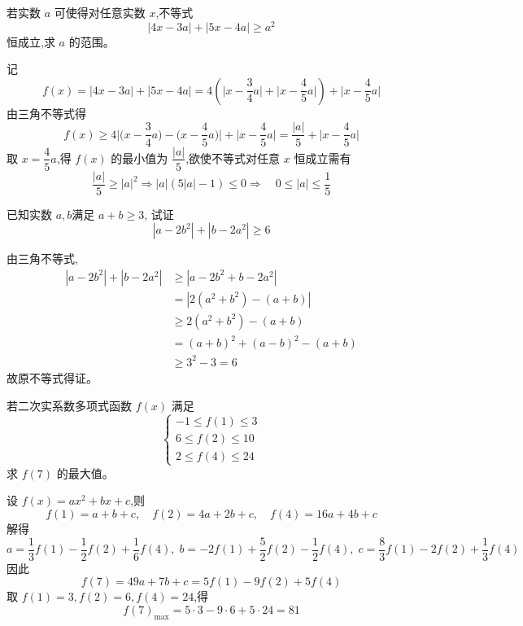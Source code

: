 \begin{questions}
    \question 若实数 $a$ 可使得对任意实数 $x$,不等式 
    \[
    |4x-3a|+|5x-4a|\ge a^{2}
    \]
    恒成立,求 $a$ 的范围。
    \begin{solution}
        记
        \[
        f(x)=|4x-3a| +|5x-4a|= 4\left( \Big|x-\frac{3}{4}a\Big|+ \Big|x-\frac{4}{5}a\Big|\right)+\Big|x-\frac{4}{5}a\Big|
        \]
        由三角不等式得
        \[
        f(x) \ge 4\Big| \Big(x-\frac{3}{4}a\Big)- \Big(x-\frac{4}{5}a\Big)\Big|+\Big|x-\frac{4}{5}a\Big|
        = \frac{|a|}{5}+ \Big|x-\frac{4}{5}a\Big|
        \]
        取 $x=\dfrac{4}{5}a$,得 $f(x)$ 的最小值为 $\dfrac{|a|}{5}$,欲使不等式对任意 $x$ 恒成立需有
        \[
        \frac{|a|}{5} \ge |a|^2 \Rightarrow |a|(5|a|-1)\le 0  \Rightarrow \quad 0\le |a|\le \frac{1}{5}
        \]
    \end{solution}

    \question 已知实数 $a,b$满足 $a+b\ge 3$, 试证 
    \[
    |a-2b^2|+|b-2a^2| \ge 6
    \]
    \begin{solution}
        由三角不等式,
        \begin{align*}
        \left| a-2b^2\right|+ \left| b-2a^2\right| 
        &\ge \left| a-2b^2+b-2a^2\right| \\
        &=\left| 2(a^2+b^2)-(a+b)\right| \\
        &\ge 2(a^2+b^2)-(a+b) \\
        &=(a+b)^2+(a-b)^2-(a+b) \\
        &\ge 3^2-3=6
        \end{align*}
        故原不等式得证。    
    \end{solution}

    \question 若二次实系数多项式函数 $f(x)$ 满足
    \[
    \begin{cases}
    -1 \le f(1) \le 3 \\
    6 \le f(2) \le 10 \\
    2 \le f(4) \le 24
    \end{cases}
    \]
    求 $f(7)$ 的最大值。
    \begin{solution}
        设 $f(x)=ax^2+bx+c$,则
        \[
        f(1)=a+b+c,\quad f(2)=4a+2b+c,\quad f(4)=16a+4b+c
        \]
        解得
        \[
        a = \frac{1}{3}f(1) - \frac{1}{2}f(2) + \frac{1}{6}f(4),\;
        b = -2f(1) + \frac{5}{2}f(2) - \frac{1}{2}f(4),\;
        c = \frac{8}{3}f(1) - 2f(2) + \frac{1}{3}f(4)
        \]
        因此
        \[
        f(7)=49a+7b+c = 5f(1)-9f(2)+5f(4)
        \]
        取 $f(1)=3,f(2)=6,f(4)=24$,得
        \[
        f(7)_{\max} =5\cdot 3 - 9\cdot 6 +5\cdot 24 =81
        \]
    \end{solution}


\end{questions}
